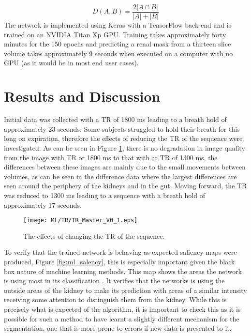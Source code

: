 \begin{equation}
D\left(A, B\right) = \frac{2\left| A \cap B \right|}{\left|A\right|+\left|B\right|}
\label{eq:dice}
\end{equation}
The network is implemented using Keras \cite{noauthor_keras_2019} with a TensorFlow \cite{noauthor_tensorflow_2019} back-end and is trained on an NVIDIA Titan Xp \ac{GPU}. Training takes approximately forty minutes for the 150 epochs and predicting a renal mask from a thirteen slice volume takes approximately 9 seconds when executed on a computer with no \ac{GPU} (as it would be in most end user cases).

\newpage
\section{Results and Discussion}

Initial data was collected with a \ac{TR} of 1800 ms leading to a breath hold of approximately 23 seconds. Some subjects struggled to hold their breath for this long on expiration, therefore the effects of reducing the \ac{TR} of the sequence were investigated. As can be seen in Figure \ref{fig:ml_tr}, there is no degradation in image quality from the image with \ac{TR} or 1800 ms to that with at \ac{TR} of 1300 ms, the differences between these images are mainly due to the small movements between volumes, as can be seen in the difference data where the largest differences are seen around the periphery of the kidneys and in the gut. Moving forward, the \ac{TR} was reduced to 1300 ms leading to a sequence with a breath hold of approximately 17 seconds.

\begin{figure}[H]
	\centering
	\texttt{[image: ML/TR/TR\_Master\_V0\_1.eps]}
	\caption{The effects of changing the \ac{TR} of the sequence.}
	\label{fig:ml_tr}	
\end{figure}

To verify that the trained network is behaving as expected saliency maps were produced, Figure \ref{fig:ml_salency}, this is especially important given the black box nature of machine learning methods. This map shows the areas the network is using most in its classification \cite{mahapatra_visual_2016}. It verifies that the networks is using the outside areas of the kidney to make its prediction with areas of a similar intensity receiving some attention to distinguish them from the kidney. While this is precisely what is expected of the algorithm, it is important to check this as it is possible for such a method to have learnt a slightly different mechanism for the segmentation, one that is more prone to errors if new data is presented to it.

